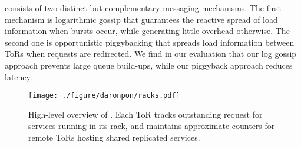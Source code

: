 \daronpon consists of two distinct but complementary messaging
mechanisms.  
%
The first mechanism is logarithmic gossip that guarantees the reactive spread of load information when bursts occur, 
while generating little overhead otherwise.  
%
The second one is opportunistic piggybacking that spreads load information between ToRs when requests are
redirected. 
%
We find in our evaluation that our log gossip approach prevents large queue build-ups, while our piggyback approach reduces latency.
%

\begin{figure}[ht]
  \centering
    \texttt{[image: ./figure/daronpon/racks.pdf]}
    \caption{High-level overview of \daronpon. Each ToR tracks
    outstanding request for services running in its rack, and
    maintains approximate counters for remote ToRs hosting shared
    replicated services.} 

  \label{fig:racks}
\end{figure}







